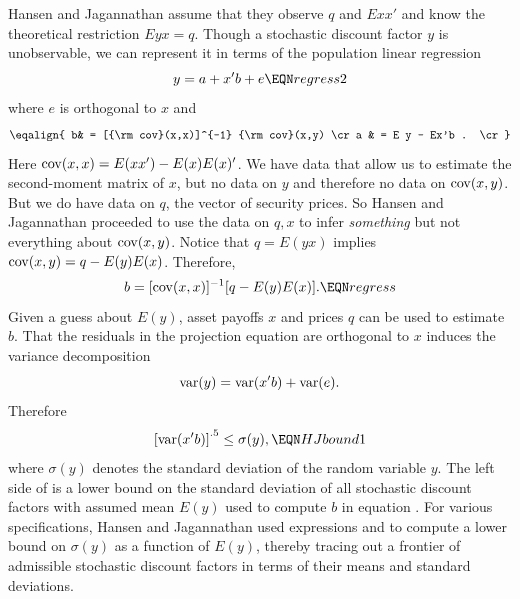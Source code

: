 Hansen and Jagannathan assume that they observe $q$ and $E x x'$ and
know the theoretical restriction $E y x = q$.
Though a stochastic discount factor  $y$ is unobservable, we can represent it in terms
of the population linear regression
$$ y = a +  x'b + e \EQN regress2 $$
where $e$ is orthogonal to $x$ and
$$\eqalign{ b& = [{\rm cov}(x,x)]^{-1} {\rm cov}(x,y) \cr
        a & = E y - Ex'b .  \cr}$$
Here ${\rm cov}(x,x) = E(x x')  - E(x) E(x)'$.
We have data that allow us to estimate the
second-moment matrix of $x$, but no data on $y$ and
therefore no data on ${\rm cov}(x,y)$. But we do
have data on $q$, the vector of security prices.
So Hansen and Jagannathan proceeded
 to use the data on $q,x$  to infer {\it something\/}
but not everything about ${\rm cov}(x,y)$.  Notice that
$ q= E(y  x)$ implies ${\rm cov}(x,y) = q - E(y) E(x)$.
Therefore,
$$ b = [{\rm cov}(x,x)]^{-1} [q - E(y) E(x)]. \EQN regress $$
Given a guess about  $E(y)$, asset payoffs $x$ and prices $q$
can be used to estimate $b$.
That the residuals in the projection equation  are orthogonal to $x$ induces the variance decomposition
$$ {\rm var} (y) = {\rm var}(x'b) + {\rm var} (e) .$$
Therefore
$$ \left[{\rm var}(x'b)\right]^{.5} \leq \sigma(y) , \EQN HJbound1 $$
where $\sigma(y)$ denotes the standard deviation of the
random variable $y$.
The left side of  is a lower bound on the standard deviation of all stochastic discount factors with
assumed mean $E(y)$ used to compute $b$ in equation .
For various specifications, Hansen and Jagannathan used expressions
   and  
to compute a lower bound on $\sigma(y)$ as a function of $E(y)$, thereby tracing
out a frontier of admissible stochastic discount factors in
terms of their means and standard deviations.


